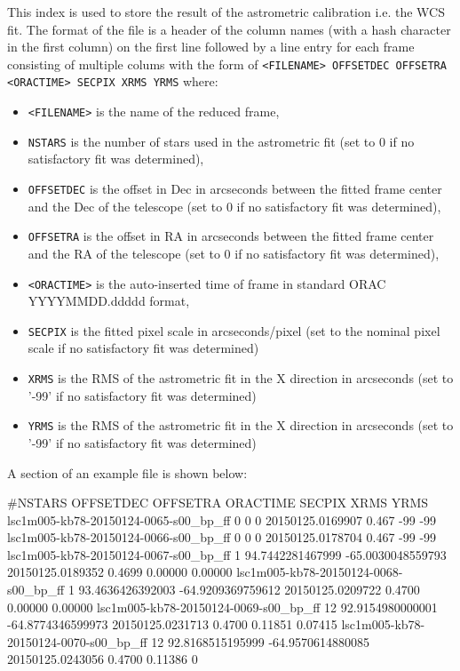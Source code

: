 \documentclass[twoside,11pt,nolof]{starlink}
\begin{document}
This index is used to store the result of the astrometric calibration i.e. the
WCS fit. The format of the file is a header of the column names (with a hash
character in the first column) on the first line followed by a line entry for
each frame consisting of multiple colums with the form of \texttt{<FILENAME>
OFFSETDEC OFFSETRA <ORACTIME> SECPIX XRMS YRMS} where:
\begin{itemize}
\item \texttt{<FILENAME>} is the name of the reduced frame, 
\item \texttt{NSTARS} is the number of stars used in the astrometric fit (set to 0 if
no satisfactory fit was determined), 
\item \texttt{OFFSETDEC} is the offset in Dec in arcseconds between the fitted
frame center and the Dec of the telescope (set to 0 if no satisfactory fit was determined), 
\item \texttt{OFFSETRA} is the offset in RA in arcseconds between the fitted
frame center and the RA of the telescope (set to 0 if no satisfactory fit was determined),
\item \texttt{<ORACTIME>} is the auto-inserted time of frame in standard ORAC
YYYYMMDD.ddddd format,
\item \texttt{SECPIX} is the fitted pixel scale in arcseconds/pixel (set to the
nominal pixel scale if no satisfactory fit was determined)
\item \texttt{XRMS} is the RMS of the astrometric fit in the X direction in
arcseconds (set to '-99' if no satisfactory fit was determined)
\item \texttt{YRMS} is the RMS of the astrometric fit in the X direction in
arcseconds (set to '-99' if no satisfactory fit was determined)
\end{itemize}

A section of an example file is shown below:
\begin{terminalv}
#NSTARS OFFSETDEC OFFSETRA ORACTIME SECPIX XRMS YRMS
lsc1m005-kb78-20150124-0065-s00_bp_ff 0 0 0 20150125.0169907 0.467 -99 -99
lsc1m005-kb78-20150124-0066-s00_bp_ff 0 0 0 20150125.0178704 0.467 -99 -99
lsc1m005-kb78-20150124-0067-s00_bp_ff 1 94.7442281467999 -65.0030048559793 20150125.0189352 0.4699 0.00000 0.00000
lsc1m005-kb78-20150124-0068-s00_bp_ff 1 93.4636426392003 -64.9209369759612 20150125.0209722 0.4700 0.00000 0.00000
lsc1m005-kb78-20150124-0069-s00_bp_ff 12 92.9154980000001 -64.8774346599973 20150125.0231713 0.4700 0.11851 0.07415
lsc1m005-kb78-20150124-0070-s00_bp_ff 12 92.8168515195999 -64.9570614880085 20150125.0243056 0.4700 0.11386 0
\end{terminalv}
\end{document}
